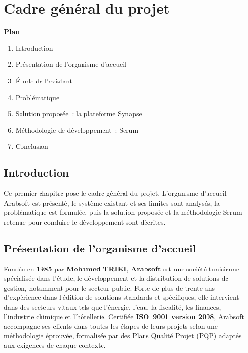 ﻿%
\chapter{Cadre général du projet}

\noindent\textbf{Plan}
\begin{enumerate}
  \item Introduction
  \item Présentation de l'organisme d'accueil
  \item Étude de l'existant
  \item Problématique
  \item Solution proposée~: la plateforme Synapse
  \item Méthodologie de développement~: Scrum
  \item Conclusion
\end{enumerate}

\section{Introduction}

Ce premier chapitre pose le cadre général du projet. L'organisme d'accueil Arabsoft
est présenté, le système existant et ses limites sont analysés, la problématique
est formulée, puis la solution proposée et la méthodologie Scrum retenue pour
conduire le développement sont décrites.

\section{Présentation de l'organisme d'accueil}

Fondée en \textbf{1985} par \textbf{Mohamed TRIKI}, \textbf{Arabsoft} est une société tunisienne spécialisée dans l'étude, le développement et la distribution de solutions de gestion, notamment pour le secteur public. Forte de plus de trente ans d'expérience dans l'édition de solutions standards et spécifiques, elle intervient dans des secteurs vitaux tels que l'énergie, l'eau, la fiscalité, les finances, l'industrie chimique et l'hôtellerie. Certifiée \textbf{ISO~9001 version 2008}, Arabsoft accompagne ses clients dans toutes les étapes de leurs projets selon une méthodologie éprouvée, formalisée par des Plans Qualité Projet (PQP) adaptés aux exigences de chaque contexte.

